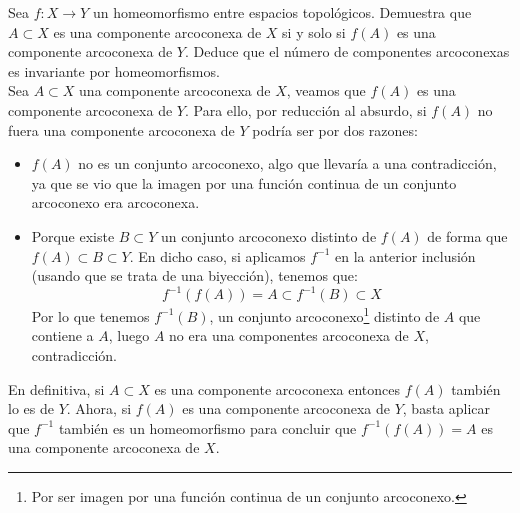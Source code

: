\begin{ejercicio}\label{ej:0.7}
    Sea $f:X\to Y$ un homeomorfismo entre espacios topológicos. Demuestra que $A\subset X$ es una componente arcoconexa de $X$ si y solo si $f(A)$ es una componente arcoconexa de $Y$. Deduce que el número de componentes arcoconexas es invariante por homeomorfismos.\\

    \noindent
    Sea $A\subset X$ una componente arcoconexa de $X$, veamos que $f(A)$ es una componente arcoconexa de $Y$. Para ello, por reducción al absurdo, si $f(A)$ no fuera una componente arcoconexa de $Y$ podría ser por dos razones:
    \begin{itemize}
        \item $f(A)$ no es un conjunto arcoconexo, algo que llevaría a una contradicción, ya que se vio que la imagen por una función continua de un conjunto arcoconexo era arcoconexa.
        \item Porque existe $B\subset Y$ un conjunto arcoconexo distinto de $f(A)$ de forma que $f(A)\subset B\subset Y$. En dicho caso, si aplicamos $f^{-1}$ en la anterior inclusión (usando que se trata de una biyección), tenemos que:
            \begin{equation*}
                f^{-1}(f(A)) = A \subset f^{-1}(B) \subset X
            \end{equation*}
            Por lo que tenemos $f^{-1}(B)$, un conjunto arcoconexo\footnote{Por ser imagen por una función continua de un conjunto arcoconexo.} distinto de $A$ que contiene a $A$, luego $A$ no era una componentes arcoconexa de $X$, contradicción.
    \end{itemize}
    En definitiva, si $A\subset X$ es una componente arcoconexa entonces $f(A)$ también lo es de $Y$. Ahora, si $f(A)$ es una componente arcoconexa de $Y$, basta aplicar que $f^{-1}$ también es un homeomorfismo para concluir que $f^{-1}(f(A)) = A$ es una componente arcoconexa de $X$.\\


\end{ejercicio}
